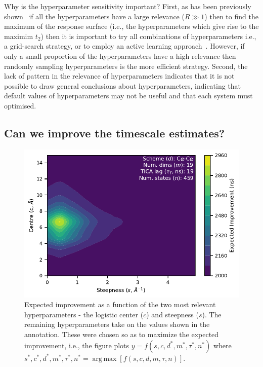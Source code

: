 \documentclass[journal=jacsat,manuscript=article]{achemso}
\DeclareMathOperator*{\argmax}{arg\,max}
\begin{document}
Why is the hyperparameter sensitivity important? First, as has been  previously shown~\cite{bergstra_jamesbergstra_random_2012} if all the hyperparameters have a large relevance ($R \gg 1$) then to find the maximum of the response surface (i.e., the hyperparameters which give rise to the maximim $t_2$) then it is important to try all combinations of hyperparameters i.e., a  grid-search strategy, or to employ an active learning approach~\cite{snoekAbstractBayesianOptimization2013}.  However, if only a small proportion of the hyperparameters have a high relevance then randomly sampling hyperparameters is the more efficient strategy.  Second, the lack of pattern in the relevance of hyperparameters indicates that it is not possible to draw general conclusions about hyperparameters, indicating that default values of hyperparameters may not be useful and that each system must optimised. 


\subsection{Can we improve the timescale estimates?}

\begin{figure}
    \centering
    \includegraphics{figures/surface_distances_logistic_ei.pdf}
    \caption{Expected improvement as a function of the two most relevant hyperparameters - the logistic center ($c$) and steepness ($s$). The remaining hyperparameters take on the values shown in the annotation. These were chosen so as to maximize the expected improvement, i.e., the figure plots $y=f(s, c, d^{*}, m^{*}, \tau^{*}, n^{*})$ where $s^{*}, c^{*}, d^{*}, m^{*}, \tau^{*}, n^{*} = \argmax \left [f(s, c, d, m, \tau,n)\right]$. }
    \label{fig:ei_surface}
\end{figure}
\end{document}

